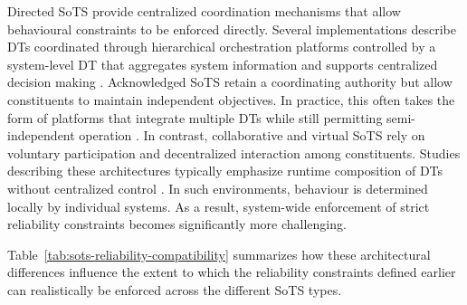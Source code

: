 Directed SoTS provide centralized coordination mechanisms that allow behavioural constraints to be enforced directly. Several implementations describe DTs coordinated through hierarchical orchestration platforms controlled by a system-level DT that aggregates system information and supports centralized decision making \cite{novak2022digitalized,parri2021framework,reiche2021digital,dickopf2019holistic}. Acknowledged SoTS retain a coordinating authority but allow constituents to maintain independent objectives. In practice, this often takes the form of platforms that integrate multiple DTs while still permitting semi-independent operation \cite{parri2019jarvis,maheshwari2022digital,bellavista2023requirements,binder2021utilizing}. In contrast, collaborative and virtual SoTS rely on voluntary participation and decentralized interaction among constituents. Studies describing these architectures typically emphasize runtime composition of DTs without centralized control \cite{acharya2023twins,gil2023modeling,esterle2021digital}. In such environments, behaviour is determined locally by individual systems. As a result, system-wide enforcement of strict reliability constraints becomes significantly more challenging.

Table~\ref{tab:sots-reliability-compatibility} summarizes how these architectural differences influence the extent to which the reliability constraints defined earlier can realistically be enforced across the different SoTS types.






